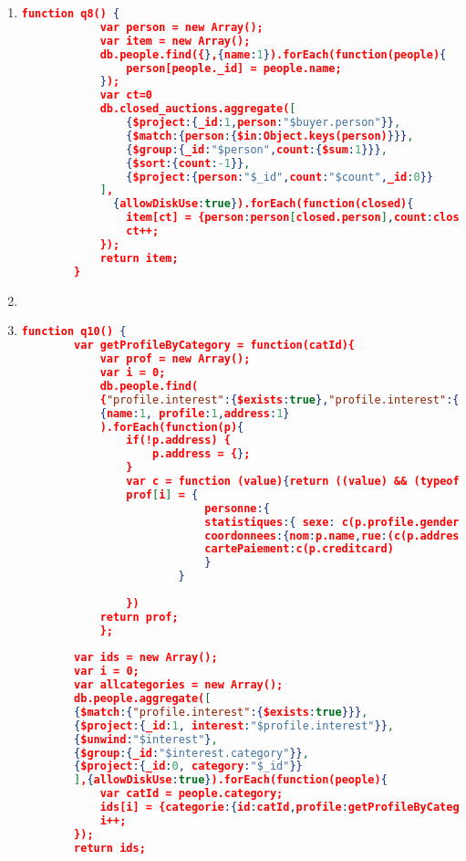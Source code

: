 \begin{enumerate}[label=Q\arabic*.]
	
    \item %
	\begin{lstlisting}[language=JSON,   basicstyle=\scriptsize]
	   function q8() {
            var person = new Array();
            var item = new Array();
            db.people.find({},{name:1}).forEach(function(people){
        		person[people._id] = people.name;
        	});
            var ct=0
            db.closed_auctions.aggregate([
        		{$project:{_id:1,person:"$buyer.person"}},
        		{$match:{person:{$in:Object.keys(person)}}},
        		{$group:{_id:"$person",count:{$sum:1}}},
        		{$sort:{count:-1}},
        		{$project:{person:"$_id",count:"$count",_id:0}}
        	],
              {allowDiskUse:true}).forEach(function(closed){
                item[ct] = {person:person[closed.person],count:closed.count}
                ct++;  
            });
            return item;
        }
	\end{lstlisting}
	
	
    \item %
	\begin{lstlisting}[language=JSON,   basicstyle=\scriptsize]
	   
	\end{lstlisting}
	
	
    \item %
	\begin{lstlisting}[language=JSON,   basicstyle=\scriptsize]
	function q10() {
	    var getProfileByCategory = function(catId){
    		var prof = new Array();
    		var i = 0;
    		db.people.find(
    		{"profile.interest":{$exists:true},"profile.interest":{"$elemMatch": {category:catId}}},
    		{name:1, profile:1,address:1}
    		).forEach(function(p){
    			if(!p.address) {
    				p.address = {};
    			}
    			var c = function (value){return ((value) && (typeof value !== "undefined")) ? value : "";}; 
    			prof[i] = {
    						personne:{
    						statistiques:{ sexe: c(p.profile.gender), age:c(p.profile.gender),education:c(p.profile.education),revenu:c(p.profile.income)},
    						coordonnees:{nom:p.name,rue:(c(p.address) && c(p.address.street)),ville:c(p.address.city),pays:c(p.address.country),reseau:{courrier:c(p.emailaddress), pagePerso:c(p.homepage)}},
    						cartePaiement:c(p.creditcard)
    						} 
    					}
    			
    			})
    		return prof;
    		};
        
        var ids = new Array();
    	var i = 0;
    	var allcategories = new Array();
    	db.people.aggregate([
    	{$match:{"profile.interest":{$exists:true}}},
    	{$project:{_id:1, interest:"$profile.interest"}},
    	{$unwind:"$interest"},
    	{$group:{_id:"$interest.category"}},
    	{$project:{_id:0, category:"$_id"}}
    	],{allowDiskUse:true}).forEach(function(people){
    		var catId = people.category;
    		ids[i] = {categorie:{id:catId,profile:getProfileByCategory(catId)}}
    		i++;
    	});
    	return ids;
    

\end{lstlisting}
\end{enumerate}
